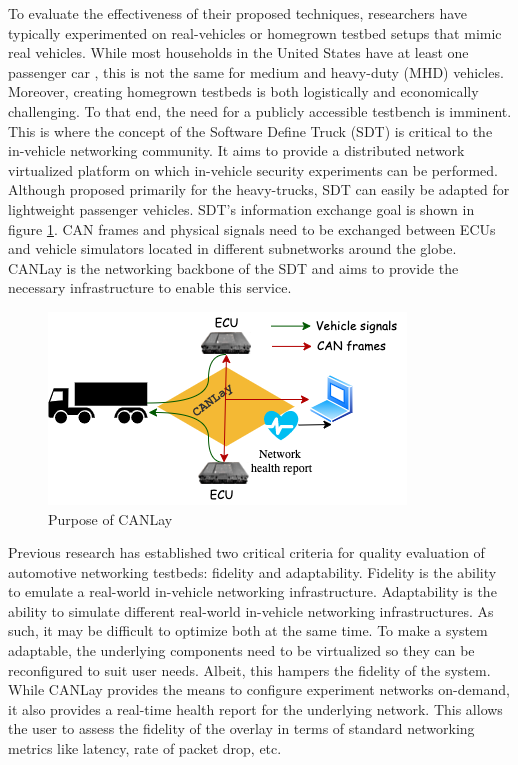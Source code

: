 \documentclass[letterpaper,twocolumn,12pt]{article}
\begin{document}
To evaluate the effectiveness of their proposed techniques, researchers have typically experimented on real-vehicles or homegrown testbed setups that mimic real vehicles. 
While most households in the United States have at least one passenger car \cite{mathilde_carlier_number_2021}, this is not the same for medium and heavy-duty (MHD) vehicles. 
Moreover, creating homegrown testbeds is both logistically and economically challenging. To that end, the need for a publicly accessible testbench is imminent. This is where the concept of the Software Define Truck (SDT) \cite{mukherjee_towards_2021} is critical to the in-vehicle networking community. It aims to provide a distributed network virtualized platform on which in-vehicle security experiments can be performed. Although proposed primarily for the heavy-trucks, SDT can easily be adapted for lightweight passenger vehicles. SDT's information exchange goal is shown in figure \ref{fig:goal}. CAN frames and physical signals need to be exchanged between ECUs and vehicle simulators located in different subnetworks around the globe. CANLay is the networking backbone of the SDT and aims to provide the necessary infrastructure to enable this service.

\begin{figure}[]
    \centering
    \includegraphics[width=\linewidth]{images/design_goal.drawio.png}
    \caption{Purpose of CANLay}
    \label{fig:goal}
\end{figure}

Previous research \cite{tagarev_automotive_2021} has established two critical criteria for quality evaluation of automotive networking testbeds: fidelity and adaptability. Fidelity is the ability to emulate a real-world in-vehicle networking infrastructure. Adaptability is the ability to simulate different real-world in-vehicle networking infrastructures. As such, it may be difficult to optimize both at the same time. To make a system adaptable, the underlying components need to be virtualized so they can be reconfigured to suit user needs. Albeit, this hampers the fidelity of the system. While CANLay provides the means to configure experiment networks on-demand, it also provides a real-time health report for the underlying network. This allows the user to assess the fidelity of the overlay in terms of standard networking metrics like latency, rate of packet drop, etc.
\end{document}
